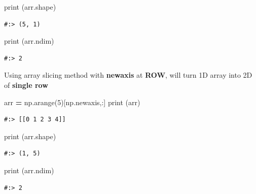 \documentclass[
]{book}
\newenvironment{Shaded}{\begin{snugshade}}{\end{snugshade}}
\newcommand{\BuiltInTok}[1]{#1}
\newcommand{\DecValTok}[1]{\textcolor[rgb]{0.06,0.06,0.06}{#1}}
\newcommand{\NormalTok}[1]{#1}
\newcommand{\OperatorTok}[1]{\textcolor[rgb]{0.43,0.43,0.43}{\textbf{#1}}}
\begin{document}
\begin{Shaded}
\begin{Highlighting}[]
\BuiltInTok{print}\NormalTok{ (arr.shape)}
\end{Highlighting}
\end{Shaded}

\begin{verbatim}
#:> (5, 1)
\end{verbatim}

\begin{Shaded}
\begin{Highlighting}[]
\BuiltInTok{print}\NormalTok{ (arr.ndim)}
\end{Highlighting}
\end{Shaded}

\begin{verbatim}
#:> 2
\end{verbatim}

Using array slicing method with \textbf{newaxis} at \textbf{ROW}, will turn 1D array into 2D of \textbf{single row}

\begin{Shaded}
\begin{Highlighting}[]
\NormalTok{arr }\OperatorTok{=}\NormalTok{ np.arange(}\DecValTok{5}\NormalTok{)[np.newaxis,:]}
\BuiltInTok{print}\NormalTok{ (arr)}
\end{Highlighting}
\end{Shaded}

\begin{verbatim}
#:> [[0 1 2 3 4]]
\end{verbatim}

\begin{Shaded}
\begin{Highlighting}[]
\BuiltInTok{print}\NormalTok{ (arr.shape)}
\end{Highlighting}
\end{Shaded}

\begin{verbatim}
#:> (1, 5)
\end{verbatim}

\begin{Shaded}
\begin{Highlighting}[]
\BuiltInTok{print}\NormalTok{ (arr.ndim)}
\end{Highlighting}
\end{Shaded}

\begin{verbatim}
#:> 2
\end{verbatim}
\end{document}
